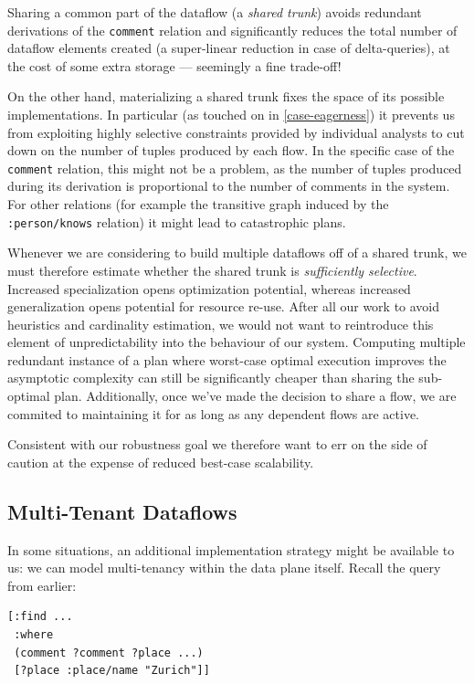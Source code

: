 \documentclass[../catalog.tex]{subfiles}
\begin{document}
Sharing a common part of the dataflow (a \emph{shared trunk}) avoids
redundant derivations of the \texttt{comment} relation and
significantly reduces the total number of dataflow elements created (a
super-linear reduction in case of delta-queries), at the cost of some
extra storage — seemingly a fine trade-off!

On the other hand, materializing a shared trunk fixes the space of its
possible implementations. In particular (as touched on in
\ref{case-eagerness}) it prevents us from exploiting highly selective
constraints provided by individual analysts to cut down on the number
of tuples produced by each flow. In the specific case of the
\texttt{comment} relation, this might not be a problem, as the number
of tuples produced during its derivation is proportional to the number
of comments in the system. For other relations (for example the
transitive graph induced by the \texttt{:person/knows} relation) it
might lead to catastrophic plans.

Whenever we are considering to build multiple dataflows off of a
shared trunk, we must therefore estimate whether the shared trunk is
\emph{sufficiently selective}. Increased specialization opens
optimization potential, whereas increased generalization opens
potential for resource re-use. After all our work to avoid heuristics
and cardinality estimation, we would not want to reintroduce this
element of unpredictability into the behaviour of our
system. Computing multiple redundant instance of a plan where
worst-case optimal execution improves the asymptotic complexity can
still be significantly cheaper than sharing the sub-optimal
plan. Additionally, once we've made the decision to share a flow, we
are commited to maintaining it for as long as any dependent flows are
active.

Consistent with our robustness goal we therefore want to err on the
side of caution at the expense of reduced best-case scalability.

\subsection{Multi-Tenant Dataflows}

In some situations, an additional implementation strategy might be
available to us: we can model multi-tenancy within the data plane
itself. Recall the query from earlier:

\begin{verbatim}
[:find ...
 :where
 (comment ?comment ?place ...)
 [?place :place/name "Zurich"]]
\end{verbatim}
\end{document}
